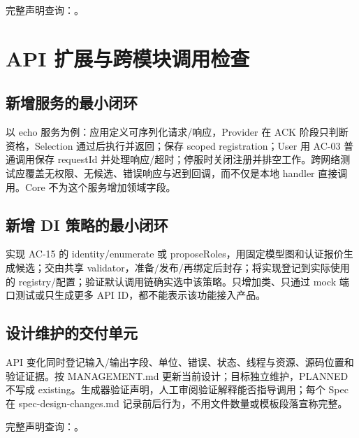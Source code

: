 完整声明查询：。

\section{API 扩展与跨模块调用检查}

\subsection{新增服务的最小闭环}
以 echo 服务为例：应用定义可序列化请求/响应，Provider 在 ACK 阶段只判断资格，Selection 通过后执行并返回；保存 scoped registration；User 用 AC-03 普通调用保存 requestId 并处理响应/超时；停服时关闭注册并排空工作。跨网络测试应覆盖无权限、无候选、错误响应与迟到回调，而不仅是本地 handler 直接调用。Core 不为这个服务增加领域字段。

\subsection{新增 DI 策略的最小闭环}
实现 AC-15 的 identity/enumerate 或 proposeRoles，用固定模型图和认证报价生成候选；交由共享 validator，准备/发布/再绑定后封存；将实现登记到实际使用的 registry/配置；验证默认调用链确实选中该策略。只增加类、只通过 mock 端口测试或只生成更多 API ID，都不能表示该功能接入产品。

\subsection{设计维护的交付单元}
API 变化同时登记输入/输出字段、单位、错误、状态、线程与资源、源码位置和验证证据。按 MANAGEMENT.md 更新当前设计；目标独立维护，PLANNED 不写成 existing。生成器验证声明，人工审阅验证解释能否指导调用；每个 Spec 在 spec-design-changes.md 记录前后行为，不用文件数量或模板段落宣称完整。

完整声明查询：。
